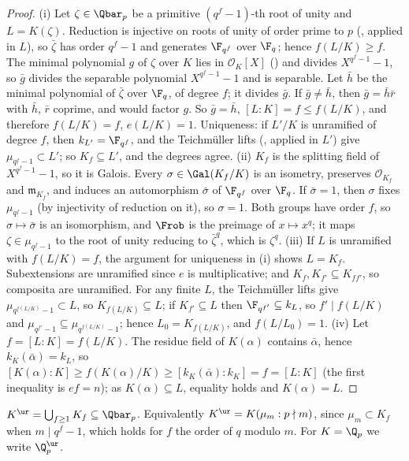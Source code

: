 \begin{proof}
(i) Let $\zeta\in\Qbar_p$ be a primitive $(q^f-1)$-th root of unity and $L=K(\zeta)$. Reduction is injective on roots of unity of order prime to $p$
(, applied in $L$), so $\bar\zeta$ has order $q^f-1$ and generates $\F_{q^f}$ over $\F_q$; hence $f(L/K)\ge f$. The minimal
polynomial $g$ of $\zeta$ over $K$ lies in $\mathcal O_K[X]$ () and divides $X^{q^f-1}-1$, so $\bar g$ divides the separable
polynomial $X^{q^f-1}-1$ and is separable. Let $\bar h$ be the minimal polynomial of $\bar\zeta$ over $\F_q$, of degree $f$; it divides $\bar g$. If
$\bar g\ne\bar h$, then $\bar g=\bar h\bar r$ with $\bar h$, $\bar r$ coprime, and  would factor $g$. So $\bar g=\bar h$,
$[L:K]=f\le f(L/K)$, and therefore $f(L/K)=f$, $e(L/K)=1$. Uniqueness: if $L'/K$ is unramified of degree $f$, then $k_{L'}=\F_{q^f}$, and the
Teichm\"uller lifts (, applied in $L'$) give $\mu_{q^f-1}\subset L'$; so $K_f\subseteq L'$, and the degrees agree.
(ii) $K_f$ is the splitting field of $X^{q^f-1}-1$, so it is Galois. Every $\sigma\in\Gal(K_f/K)$ is an isometry, preserves $\mathcal O_{K_f}$ and
$\mathfrak m_{K_f}$, and induces an automorphism $\bar\sigma$ of $\F_{q^f}$ over $\F_q$. If $\bar\sigma=1$, then $\sigma$ fixes $\mu_{q^f-1}$ (by injectivity of
reduction on it), so $\sigma=1$. Both groups have order $f$, so $\sigma\mapsto\bar\sigma$ is an isomorphism, and $\Frob$ is the preimage of $x\mapsto x^q$;
it maps $\zeta\in\mu_{q^f-1}$ to the root of unity reducing to $\bar\zeta^q$, which is $\zeta^q$.
(iii) If $L$ is unramified with $f(L/K)=f$, the argument for uniqueness in (i) shows $L=K_f$. Subextensions are unramified since $e$ is
multiplicative; and $K_f,K_{f'}\subseteq K_{ff'}$, so composita are unramified. For any finite $L$, the Teichm\"uller lifts give
$\mu_{q^{f(L/K)}-1}\subset L$, so $K_{f(L/K)}\subseteq L$; if $K_{f'}\subseteq L$ then $\F_{q^{f'}}\subseteq k_L$, so $f'\mid f(L/K)$ and
$\mu_{q^{f'}-1}\subseteq\mu_{q^{f(L/K)}-1}$; hence $L_0=K_{f(L/K)}$, and $f(L/L_0)=1$. (iv) Let $f=[L:K]=f(L/K)$. The residue field of $K(\alpha)$
contains $\bar\alpha$, hence $k_K(\bar\alpha)=k_L$, so $[K(\alpha):K]\ge f(K(\alpha)/K)\ge[k_K(\bar\alpha):k_K]=f=[L:K]$ (the first inequality is $ef=n$);
as $K(\alpha)\subseteq L$, equality holds and $K(\alpha)=L$.
\end{proof}

\begin{definition}\label{def:local:qpur}
$K^{\ur}=\bigcup_{f\ge1}K_f\subseteq\Qbar_p$. Equivalently $K^{\ur}=K(\mu_m:p\nmid m)$, since $\mu_m\subset K_f$ when $m\mid q^f-1$, which holds for $f$ the
order of $q$ modulo $m$. For $K=\Q_p$ we write $\Q_p^{\ur}$.
\end{definition}

